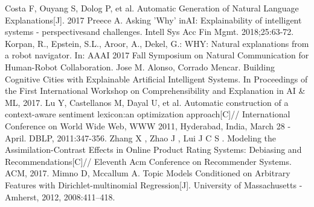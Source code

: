 \documentclass[runningheads]{llncs}
\begin{document}
\begin{thebibliography}{25}
 Costa F, Ouyang S, Dolog P, et al. Automatic Generation of Natural Language Explanations[J]. 2017
Preece A. Asking 'Why' inAI: Explainability of intelligent systems - perspectivesand challenges. Intell Sys Acc Fin Mgmt. 2018;25:63-72.
Korpan, R., Epstein, S.L., Aroor, A., Dekel, G.: WHY: Natural explanations from a robot navigator. In: AAAI 2017 Fall Symposium on Natural Communication for Human-Robot Collaboration.
Jose M. Alonso, Corrado Mencar. Building Cognitive Cities with Explainable Artificial Intelligent Systems. In Proceedings of the First International Workshop on Comprehensibility and Explanation in AI \& ML, 2017.
Lu Y, Castellanos M, Dayal U, et al. Automatic construction of a context-aware sentiment lexicon:an optimization approach[C]// International Conference on World Wide Web, WWW 2011, Hyderabad, India, March 28 - April. DBLP, 2011:347-356.
Zhang X , Zhao J , Lui J C S . Modeling the Assimilation-Contrast Effects in Online Product Rating Systems: Debiasing and Recommendations[C]// Eleventh Acm Conference on Recommender Systems. ACM, 2017.
Mimno D, Mccallum A. Topic Models Conditioned on Arbitrary Features with Dirichlet-multinomial Regression[J]. University of Massachusetts - Amherst, 2012, 2008:411--418.
\end{thebibliography}
\end{document}
